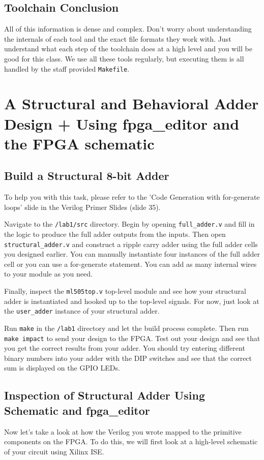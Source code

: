 \documentclass[11pt]{article}
\begin{document}
\subsection{Toolchain Conclusion}
All of this information is dense and complex. Don't worry about understanding the internals of each tool and the exact file formats they work with. Just understand what each step of the toolchain does at a high level and you will be good for this class. We use all these tools regularly, but executing them is all handled by the staff provided \verb|Makefile|.


\section{A Structural and Behavioral Adder Design + Using fpga\_editor and the FPGA schematic}

\subsection{Build a Structural 8-bit Adder}
To help you with this task, please refer to the 'Code Generation with for-generate loops' slide in the Verilog Primer Slides (slide 35).

Navigate to the \verb|/lab1/src| directory. Begin by opening \verb|full_adder.v| and fill in the logic to produce the full adder outputs from the inputs. Then open \verb|structural_adder.v| and construct a ripple carry adder using the full adder cells you designed earlier. You can manually instantiate four instances of the full adder cell or you can use a for-generate statement. You can add as many internal wires to your module as you need.

Finally, inspect the \verb|ml505top.v| top-level module and see how your structural adder is instantiated and hooked up to the top-level signals. For now, just look at the \verb|user_adder| instance of your structural adder.

Run \verb|make| in the \verb|/lab1| directory and let the build process complete. Then run \verb|make impact| to send your design to the FPGA. Test out your design and see that you get the correct results from your adder. You should try entering different binary numbers into your adder with the DIP switches and see that the correct sum is displayed on the GPIO LEDs. 

\subsection{Inspection of Structural Adder Using Schematic and fpga\_editor}
Now let's take a look at how the Verilog you wrote mapped to the primitive components on the FPGA. To do this, we will first look at a high-level schematic of your circuit using Xilinx ISE.
\end{document}
